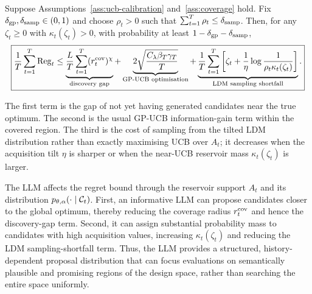 \begin{theorem}
\label{thm:regret}
Suppose Assumptions~\ref{ass:ucb-calibration} and~\ref{ass:coverage} hold. Fix $\delta_{\rm gp},\delta_{\rm samp}\in(0,1)$ and choose
$\rho_t>0$ such that $\sum_{t=1}^T\rho_t\le\delta_{\rm samp}$. Then, for any $\zeta_t\ge0$ with
$\kappa_t(\zeta_t)>0$, with probability at least $1-\delta_{\rm gp}-\delta_{\rm samp}$,
\[
  \boxed{
  \frac{1}{T}\sum_{t=1}^T \mathrm{Reg}_t
  \le
  \underbrace{\frac{L}{T}\sum_{t=1}^T(r_t^{\rm cov})^\chi}_{\text{discovery gap}}
  +
  \underbrace{2\sqrt{\frac{C_\lambda\beta_T\gamma_T}{T}}}_{\text{GP-UCB optimisation}}
  +
  \underbrace{
  \frac1T\sum_{t=1}^T
  \left[
  \zeta_t+
  \frac1\eta\log\frac1{\rho_t\kappa_t(\zeta_t)}
  \right]
  }_{\text{LDM sampling shortfall}} .
  }
\]
\end{theorem}

The first term is the gap of not yet having generated candidates near the true optimum. The second is the usual GP-UCB information-gain term within the covered region. The third is the cost of sampling from the tilted LDM distribution rather than exactly maximising UCB over $A_t$; it decreases when the acquisition tilt $\eta$ is sharper or when the near-UCB reservoir mass $\kappa_t(\zeta_t)$ is larger.

The LLM affects the regret bound through the reservoir support \(A_t\) and its distribution \(p_{\theta,\alpha}(\cdot\mid\mathcal{C}_t)\). First, an informative LLM can propose candidates closer to the global optimum, thereby reducing the coverage radius \(r_t^{\rm cov}\) and hence the discovery-gap term. Second, it can assign substantial probability mass to candidates with high acquisition values, increasing \(\kappa_t(\zeta_t)\) and reducing the LDM sampling-shortfall term. Thus, the LLM provides a structured, history-dependent proposal distribution that can focus evaluations on semantically plausible and promising regions of the design space, rather than searching the entire space uniformly.
